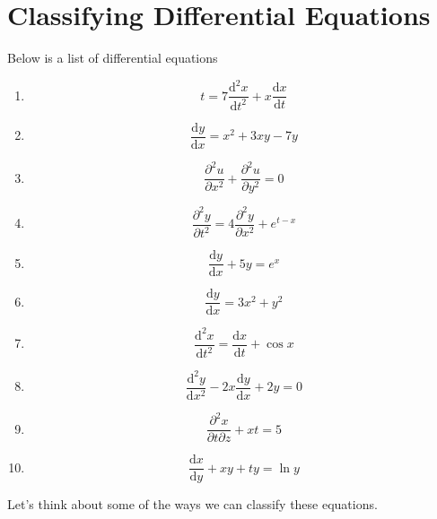 \section{Classifying Differential Equations}
\noindent
Below is a list of differential equations
\begin{enumerate}
	\item \begin{equation*}
		t = 7\frac{\mathrm{d}^2 x}{\mathrm{d} t^2} + x\frac{\mathrm{d} x}{\mathrm{d} t}
	\end{equation*}
	\item \begin{equation*}
		\frac{\mathrm{d}y}{\mathrm{d}x} = x^2 + 3xy -7y
	\end{equation*}
	\item \begin{equation*}
		\frac{\partial^2 u}{\partial x^2} + \frac{\partial^2 u}{\partial y^2} = 0
	\end{equation*}
	\item \begin{equation*}
		\frac{\partial^2 y}{\partial t^2} = 4\frac{\partial^2 y}{\partial x^2} + e^{t-x}
	\end{equation*}
	\item \begin{equation*}
		\frac{\mathrm{d} y}{\mathrm{d} x} + 5y = e^x
	\end{equation*}
	\item \begin{equation*}
		\frac{\mathrm{d} y}{\mathrm{d} x} = 3x^2 + y^2
	\end{equation*}
	\item \begin{equation*}
		\frac{\mathrm{d}^2 x}{\mathrm{d} t^2} = \frac{\mathrm{d}x}{\mathrm{d}t} + \cos{x}
	\end{equation*}
	\item \begin{equation*}
		\frac{\mathrm{d}^2 y}{\mathrm{d} x^2} - 2x\frac{\mathrm{d} y}{\mathrm{d} x} + 2y = 0
	\end{equation*}
	\item \begin{equation*}
		\frac{\partial^2 x}{\partial t \partial z} + xt = 5
	\end{equation*}
	\item \begin{equation*}
		\frac{\mathrm{d} x}{\mathrm{d}y} + xy + ty = \ln{y}
	\end{equation*}
\end{enumerate}
Let's think about some of the ways we can classify these equations.




